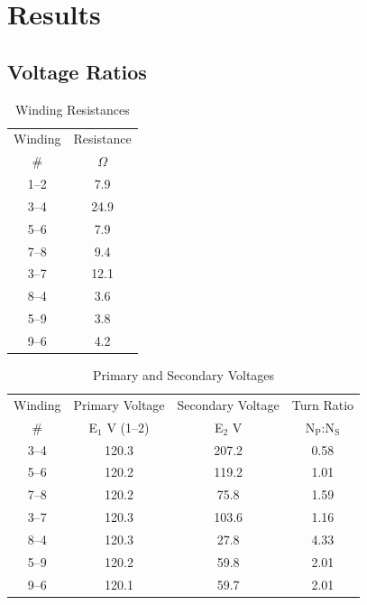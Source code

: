 \documentclass{article}
\begin{document}
\section{Results}
\subsection{Voltage Ratios}
\begin{table}[H]
  \centering
  \begin{tabular}{cc}
    \hline
    Winding & Resistance \\
    \# & $\Omega$ \\
    \hline
    1--2 &  7.9 \\
    3--4 & 24.9 \\
    5--6 &  7.9 \\
    7--8 &  9.4 \\
    3--7 & 12.1 \\
    8--4 &  3.6 \\
    5--9 &  3.8 \\
    9--6 &  4.2 \\
  \end{tabular}
  \caption{Winding Resistances}
  \label{tab:wind_res}
\end{table}

\begin{table}[H]
  \centering
  \begin{tabular}{cccc}
    \hline
    Winding & Primary Voltage & Secondary Voltage & Turn Ratio \\
    \# & E$_1$ V (1--2) & E$_2$ V & N$_\text{P}$:N$_\text{S}$\\
    \hline
    3--4 & 120.3 & 207.2 & 0.58 \\
    5--6 & 120.2 & 119.2 & 1.01 \\
    7--8 & 120.2 &  75.8 & 1.59 \\
    3--7 & 120.3 & 103.6 & 1.16 \\
    8--4 & 120.3 &  27.8 & 4.33 \\
    5--9 & 120.2 &  59.8 & 2.01 \\
    9--6 & 120.1 &  59.7 & 2.01 \\
  \end{tabular}
  \caption{Primary and Secondary Voltages}
  \label{tab:volt_rat}
\end{table}
\end{document}
